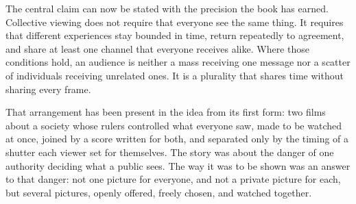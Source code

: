 The central claim can now be stated with the precision the book has earned. Collective viewing does not require that everyone see the same thing. It requires that different experiences stay bounded in time, return repeatedly to agreement, and share at least one channel that everyone receives alike. Where those conditions hold, an audience is neither a mass receiving one message nor a scatter of individuals receiving unrelated ones. It is a plurality that shares time without sharing every frame.

That arrangement has been present in the idea from its first form: two films about a society whose rulers controlled what everyone saw, made to be watched at once, joined by a score written for both, and separated only by the timing of a shutter each viewer set for themselves. The story was about the danger of one authority deciding what a public sees. The way it was to be shown was an answer to that danger: not one picture for everyone, and not a private picture for each, but several pictures, openly offered, freely chosen, and watched together.

